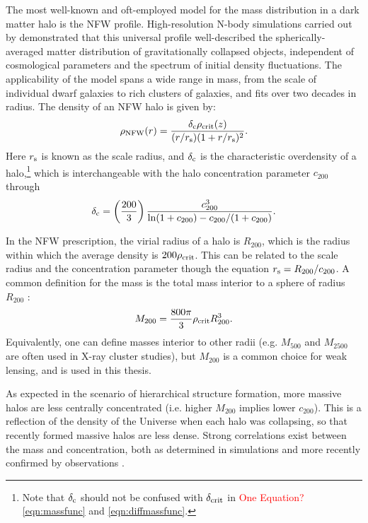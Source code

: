 The most well-known and oft-employed model for the mass distribution in a dark matter halo is the \ac{NFW} profile. High-resolution N-body simulations carried out by \citet{nfw96} demonstrated that this universal profile well-described the spherically-averaged matter distribution of gravitationally collapsed objects, independent of cosmological parameters and the spectrum of initial density fluctuations. The applicability of the model spans a wide range in mass, from the scale of individual dwarf galaxies to rich clusters of galaxies, and fits over two decades in radius. The density of an \ac{NFW} halo is given by:
\begin{equation}
\rho_{\mathrm{NFW}}(r) = \frac{\delta_{\rm c} \rho_{\mathrm{crit}}(z)}{(r/r_{\rm s})(1+r/r_{\rm s})^2}.
\end{equation}
Here $r_{\rm s}$ is known as the scale radius, and $\delta_{\rm c}$ is the characteristic overdensity of a halo,\footnote{Note that $\delta_{\rm c}$ should not be confused with $\delta_{\rm crit}$ in \textcolor{red}{One Equation?} \autoref{eqn:massfunc} and \autoref{eqn:diffmassfunc}.} which is interchangeable with the halo concentration parameter $c_{200}$ through
\begin{equation}
\delta_{\rm c} = \left( \frac{200}{3} \right) \frac{c_{200}^3}{{\rm ln}(1+c_{200}) - c_{200}/(1+c_{200})}.
\end{equation}

In the \ac{NFW} prescription, the virial radius of a halo is $R_{200}$, which is the radius within which the average density is $200\rho_{\rm crit}$. This can be related to the scale radius and the concentration parameter though the equation $r_{\rm s} = R_{200}/c_{200}$. A common definition for the mass is the total mass interior to a sphere of radius $R_{200}$ \citep{Wright00}:
\begin{equation}
M_{200} = \frac{800 \pi}{3} \rho_{\rm crit} R_{200}^3.
\end{equation}
Equivalently, one can define masses interior to other radii (e.g. $M_{500}$ and $M_{2500}$ are often used in X-ray cluster studies), but $M_{200}$ is a common choice for weak lensing, and is used in this thesis.

As expected in the scenario of hierarchical structure formation, more massive halos are less centrally concentrated (i.e. higher $M_{200}$ implies lower $c_{200}$). This is a reflection of the density of the Universe when each halo was collapsing, so that recently formed massive halos are less dense. Strong correlations exist between the mass and concentration, both as determined in simulations \citep{Duffy08,Prada12,Dutton14} and more recently confirmed by observations \citep{Okabe13,Merten14}. 

